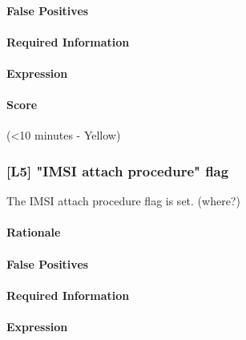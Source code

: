 \documentclass[a4paper,11pt,notitlepage,bigheadings,oneside]{scrartcl}
\begin{document}
\TBD{}

\paragraph{False Positives}

\TBD{}

\paragraph{Required Information}

\TBD{}

\paragraph{Expression}

\TBD{}

\paragraph{Score}

\TBD{} (\textless 10 minutes - Yellow)

\subsubsection{[L5] "IMSI attach procedure" flag}

The IMSI attach procedure flag is set. (where?)

\paragraph{Rationale}

\TBD{}

\paragraph{False Positives}

\TBD{}

\paragraph{Required Information}

\TBD{}

\paragraph{Expression}

\TBD{}
\end{document}
